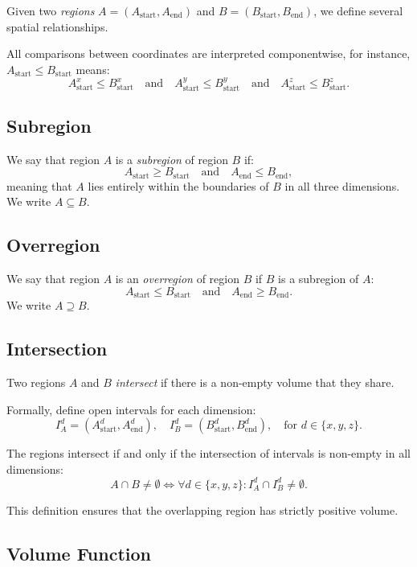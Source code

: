 Given two \textit{regions} $A = (A_\text{start}, A_\text{end})$  and $B = (B_\text{start}, B_\text{end})$, we define several spatial relationships.  

All comparisons between coordinates are interpreted componentwise, for instance, $A_\text{start} \leq B_\text{start}$ means:
\[
A_\text{start}^x \leq B_\text{start}^x \quad \text{and} \quad A_\text{start}^y \leq B_\text{start}^y \quad \text{and} \quad A_\text{start}^z \leq B_\text{start}^z.
\]

\subsection*{Subregion}
We say that region $A$ is a \emph{subregion} of region $B$ if:
\[
A_\text{start} \geq B_\text{start} \quad \text{and} \quad A_\text{end} \leq B_\text{end},
\]
meaning that $A$ lies entirely within the boundaries of $B$ in all three dimensions. We write $A \subseteq B$.

\subsection*{Overregion}
We say that region $A$ is an \emph{overregion} of region $B$ if $B$ is a subregion of $A$:
\[
A_\text{start} \leq B_\text{start} \quad \text{and} \quad A_\text{end} \geq B_\text{end}.
\]
We write $A \supseteq B$.


\subsection*{Intersection}
Two regions $A$ and $B$ \emph{intersect} if there is a non-empty volume that they share.

Formally, define open intervals for each dimension:
\[
I_A^d = (A_\text{start}^d, A_\text{end}^d), \quad I_B^d = (B_\text{start}^d, B_\text{end}^d), \quad \text{for } d \in \{x, y, z\}.
\]

The regions intersect if and only if the intersection of intervals is non-empty in all dimensions:
\[
A \cap B \neq \emptyset \iff \forall d \in \{x, y, z\}: I_A^d \cap I_B^d \neq \emptyset.
\]

This definition ensures that the overlapping region has strictly positive volume.



\subsection*{Volume Function}

